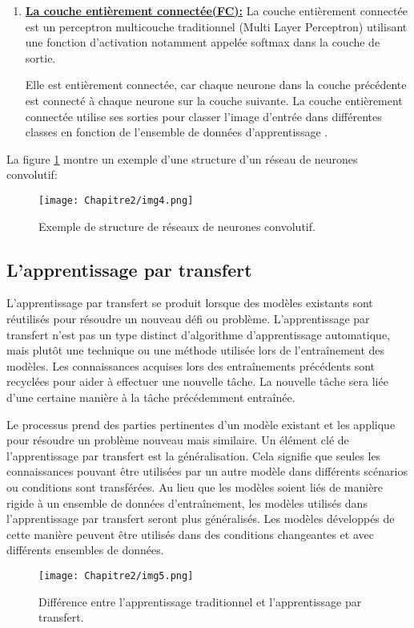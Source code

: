 \begin{enumerate}
\item \underline{\textbf{La couche entièrement connectée(FC):}}
La couche entièrement connectée est un perceptron multicouche traditionnel (Multi Layer Perceptron) utilisant une fonction d'activation notamment appelée softmax dans la couche de sortie. 

Elle est entièrement connectée, car chaque neurone dans la couche précédente est connecté à chaque neurone sur la couche suivante. La couche entièrement connectée utilise ses sorties pour classer l'image d'entrée dans différentes classes en fonction de l'ensemble de données d'apprentissage \cite{CNN2015}.  
\end{enumerate}     
La figure \ref{img4} montre un exemple d'une structure d'un réseau de neurones convolutif:
     \begin{figure}[H]
          \centering
          \texttt{[image: Chapitre2/img4.png]}
          \caption{Exemple de structure de réseaux de neurones convolutif.}
          \label{img4}
          \end{figure}

     \subsection{L'apprentissage par transfert} 
     L'apprentissage par transfert se produit lorsque des modèles existants sont réutilisés pour résoudre un nouveau défi ou problème. L'apprentissage par transfert n'est pas un type distinct d'algorithme d'apprentissage automatique, mais plutôt une technique ou une méthode utilisée lors de l'entraînement des modèles. Les connaissances acquises lors des entraînements précédents sont recyclées pour aider à effectuer une nouvelle tâche. La nouvelle tâche sera liée d'une certaine manière à la tâche précédemment entraînée.

     Le processus prend des parties pertinentes d'un modèle existant et les applique pour résoudre un problème nouveau mais similaire. Un élément clé de l'apprentissage par transfert est la généralisation. Cela signifie que seules les connaissances pouvant être utilisées par un autre modèle dans différents scénarios ou conditions sont transférées. Au lieu que les modèles soient liés de manière rigide à un ensemble de données d'entraînement, les modèles utilisés dans l'apprentissage par transfert seront plus généralisés. Les modèles développés de cette manière peuvent être utilisés dans des conditions changeantes et avec différents ensembles de données.
     \begin{figure}[H]
          \centering
          \texttt{[image: Chapitre2/img5.png]}
          \caption{Différence entre l'apprentissage traditionnel et l'apprentissage par transfert.}
          \label{img5}
          \end{figure}

